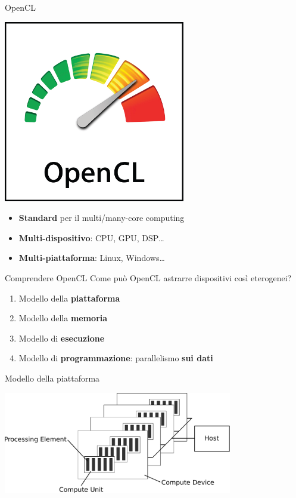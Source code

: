 \documentclass[11pt,xcolor=dvipsnames]{beamer}
\begin{document}
\begin{frame}{OpenCL}
\begin{center}
\includegraphics[scale=1]{img/opencl-logo.png}
\end{center}

\begin{itemize}
\item \textbf{Standard} per il multi/many-core computing
\item \textbf{Multi-dispositivo}: CPU, GPU, DSP\ldots{}
\item \textbf{Multi-piattaforma}: Linux, Windows\ldots{}
\end{itemize}
\end{frame}

\begin{frame}{Comprendere OpenCL}
Come può OpenCL astrarre dispositivi così eterogenei?
\begin{enumerate}
\item Modello della \textbf{piattaforma}
\item Modello della \textbf{memoria}
\item Modello di \textbf{esecuzione}
\item Modello di \textbf{programmazione}: parallelismo \textbf{sui dati}
\end{enumerate} 
\end{frame}

\begin{frame}{Modello della piattaforma}
\vspace{5mm}
\begin{center}
\includegraphics[width=10cm]{img/opencl-platform-model.pdf}
\end{center}
\end{frame}
\end{document}
